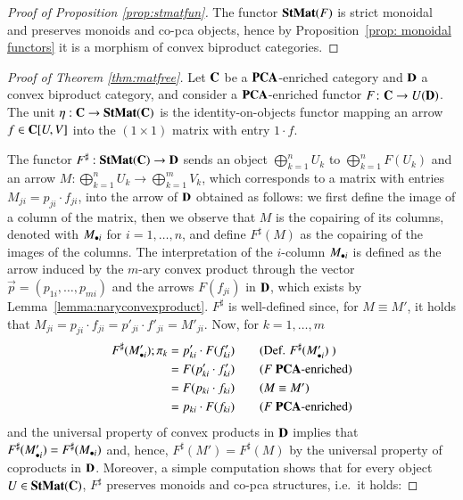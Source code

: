 \begin{proof}[Proof of Proposition \ref{prop:stmatfun}]
    The functor $\mathbf{StMat}(F)$ is strict monoidal and preserves monoids and co-pca objects, hence by Proposition~\ref{prop: monoidal functors} it is a morphism of convex biproduct categories.
\end{proof}

\begin{proof}[Proof of Theorem \ref{thm:matfree}]
    Let $\mathbf{C}$ be a $\mathbf{PCA}$-enriched category and $\mathbf{D}$ a convex biproduct category, and consider a $\mathbf{PCA}$-enriched functor $F\colon \mathbf{C}\to U(\mathbf{D})$. The unit $\eta:\mathbf{C}\to \mathbf{StMat}(\mathbf{C})$ is the identity-on-objects functor mapping an arrow $f\in\mathbf{C}[U,V]$ into the $(1\times 1)$ matrix with entry $1\cdot f$. 
    
   The functor $F^\sharp:\mathbf{StMat}(\mathbf{C})\to \mathbf{D}$ sends an object $\bigoplus_{k=1}^n U_k$ to $\bigoplus_{k=1}^n F(U_k)$ and an arrow $M\colon\bigoplus_{k=1}^n U_k\to \bigoplus_{k=1}^m V_k$, which corresponds to a matrix with entries $M_{ji}= p_{ji}\cdot f_{ji}$, into the arrow of $\mathbf{D}$ obtained as follows:
     we first define the image of a column of the matrix, then we observe that $M$ is the copairing of its columns, denoted with $M_{\bullet i}$ for $i=1,\dots,n$, and define $F^\sharp(M)$ as the copairing of the images of the columns. The interpretation of the $i$-column $M_{\bullet i}$ is defined as the arrow induced by the $m$-ary convex product through the vector $\vec{p}=(p_{1i},\dots,p_{mi})$ and the arrows $F(f_{ji})$ in $\mathbf{D}$, which exists by Lemma~\ref{lemma:naryconvexproduct}. $F^\sharp$ is well-defined since, for $M\equiv M'$, it holds that $M_{ji}=p_{ji}\cdot f_{ji}= p'_{ji}\cdot f'_{ji}= M'_{ji}$. Now, for $k=1,\dots, m$
    \begin{align} 
        F^\sharp(\column{M'}{i});\pi_k&=p'_{ki}\cdot F(f'_{ki})\tag{Def. $F^\sharp(\column{M'}{i})$ }\\
        &=F(p'_{ki}\cdot f'_{ki}) \tag{$F$ $\Cat{PCA}$-enriched}\\
        &= F(p_{ki}\cdot f_{ki}) \tag{$M\equiv M'$}\\
        &=p_{ki}\cdot F(f_{ki}) \tag{$F$ $\Cat{PCA}$-enriched}
        \end{align}   
        and the universal property of convex products in $\mathbf{D}$ implies that $F^\sharp(M'_{\bullet i})= F^\sharp(M_{\bullet i})$ and, hence, $F^\sharp(M')=F^\sharp(M)$ by the universal property of coproducts in $\mathbf{D}$. Moreover, a simple computation shows that for every object $U\in\mathbf{StMat}(\mathbf{C})$, $F^\sharp$ preserves monoids and co-pca structures, i.e.\ it holds: 
    

\end{proof}
